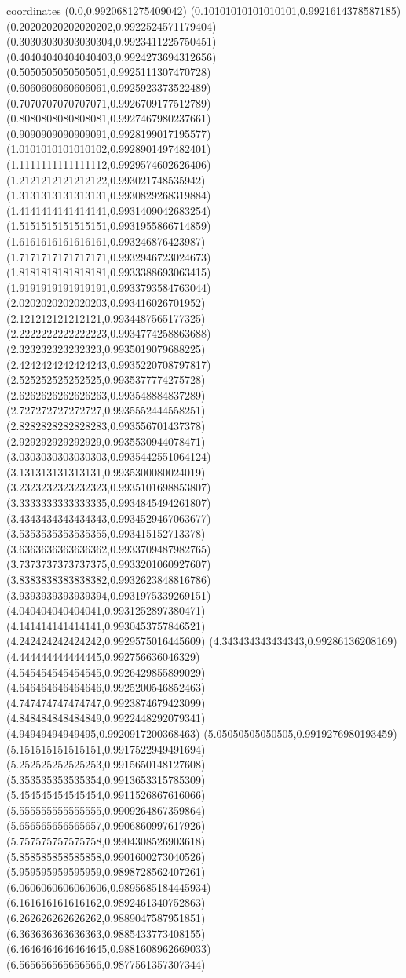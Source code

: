 coordinates {%
(0.0,0.9920681275409042)
(0.10101010101010101,0.9921614378587185)
(0.20202020202020202,0.9922524571179404)
(0.30303030303030304,0.9923411225750451)
(0.40404040404040403,0.9924273694312656)
(0.5050505050505051,0.9925111307470728)
(0.6060606060606061,0.9925923373522489)
(0.7070707070707071,0.9926709177512789)
(0.8080808080808081,0.9927467980237661)
(0.9090909090909091,0.9928199017195577)
(1.0101010101010102,0.9928901497482401)
(1.1111111111111112,0.9929574602626406)
(1.2121212121212122,0.993021748535942)
(1.3131313131313131,0.9930829268319884)
(1.4141414141414141,0.9931409042683254)
(1.5151515151515151,0.9931955866714859)
(1.6161616161616161,0.993246876423987)
(1.7171717171717171,0.9932946723024673)
(1.8181818181818181,0.9933388693063415)
(1.9191919191919191,0.9933793584763044)
(2.0202020202020203,0.993416026701952)
(2.121212121212121,0.9934487565177325)
(2.2222222222222223,0.9934774258863688)
(2.323232323232323,0.9935019079688225)
(2.4242424242424243,0.9935220708797817)
(2.525252525252525,0.9935377774275728)
(2.6262626262626263,0.993548884837289)
(2.727272727272727,0.9935552444558251)
(2.8282828282828283,0.993556701437378)
(2.929292929292929,0.9935530944078471)
(3.0303030303030303,0.9935442551064124)
(3.131313131313131,0.9935300080024019)
(3.2323232323232323,0.9935101698853807)
(3.3333333333333335,0.9934845494261807)
(3.4343434343434343,0.9934529467063677)
(3.5353535353535355,0.993415152713378)
(3.6363636363636362,0.9933709487982765)
(3.7373737373737375,0.9933201060927607)
(3.8383838383838382,0.9932623848816786)
(3.9393939393939394,0.9931975339269151)
(4.040404040404041,0.9931252897380471)
(4.141414141414141,0.9930453757846521)
(4.242424242424242,0.9929575016445609)
(4.343434343434343,0.99286136208169)
(4.444444444444445,0.992756636046329)
(4.545454545454545,0.9926429855899029)
(4.646464646464646,0.9925200546852463)
(4.747474747474747,0.9923874679423099)
(4.848484848484849,0.9922448292079341)
(4.94949494949495,0.9920917200368463)
(5.05050505050505,0.9919276980193459)
(5.151515151515151,0.9917522949491694)
(5.252525252525253,0.9915650148127608)
(5.353535353535354,0.9913653315785309)
(5.454545454545454,0.9911526867616066)
(5.555555555555555,0.9909264867359864)
(5.656565656565657,0.9906860997617926)
(5.757575757575758,0.9904308526903618)
(5.858585858585858,0.9901600273040526)
(5.959595959595959,0.9898728562407261)
(6.0606060606060606,0.9895685184445934)
(6.161616161616162,0.9892461340752863)
(6.262626262626262,0.9889047587951851)
(6.363636363636363,0.9885433773408155)
(6.4646464646464645,0.9881608962669033)
(6.565656565656566,0.9877561357307344)
}
